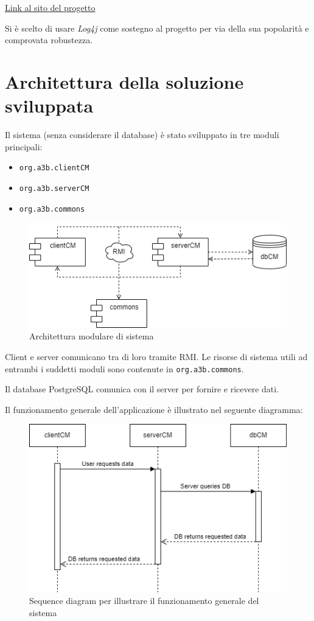 \href{https://logging.apache.org/log4j/2.x/}{Link al sito del progetto}

Si è scelto di usare \textsl{Log4j} come sostegno al progetto per via della sua popolarità e comprovata robustezza.

\chapter{Architettura della soluzione sviluppata}
Il sistema (senza considerare il database) è stato sviluppato in tre moduli principali:
\begin{itemize}
	\item \texttt{org.a3b.clientCM}
	\item \texttt{org.a3b.serverCM}
	\item \texttt{org.a3b.commons}
\end{itemize}

\begin{figure}[h]
	\centering
	\caption{Architettura modulare di sistema}
	\label{fig:architettuta}
	\includegraphics[width=0.8\linewidth]{../../fig/img/tecnico/architettuta.drawio}
\end{figure}

Client e server comunicano tra di loro tramite RMI. Le risorse di sistema utili ad entrambi i suddetti moduli sono contenute in \texttt{org.a3b.commons}.

Il database PostgreSQL comunica con il server per fornire e ricevere dati.

\pagebreak
Il funzionamento generale dell'applicazione è illustrato nel seguente diagramma:

\begin{figure}[h]
	\centering
	\caption{Sequence diagram per illustrare il funzionamento generale del sistema}
	\label{fig:sequence}
	\includegraphics[width=0.7\linewidth]{../../fig/img/tecnico/sequence.drawio}
\end{figure}

